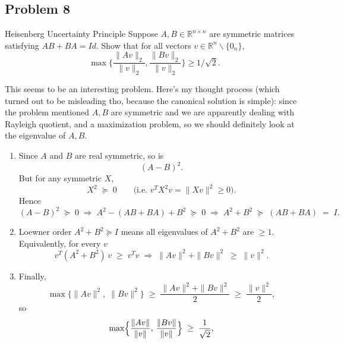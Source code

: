 \documentclass[../main]{subfiles}
\begin{document}
\subsection{Problem 8}
\begin{bbox}{Heisenberg Uncertainty Principle}
    Suppose $A, B \in \mathbb R^{n\times n}$ are symmetric matrices satisfying $AB + BA = Id$. Show that for all vectors $v\in \mathbb R^n\backslash\{0_n\}$,
    \[
    \max \{\frac{\|Av\|_2}{\|v\|_2}, \frac{\|Bv\|_2}{\|v\|_2}\} \geq 1/\sqrt{2}.
    \]
\end{bbox}
\begin{solution}
    This seems to be an interesting problem. Here's my thought process (which turned out to be misleading tho, because the canonical solution is simple): since the problem mentioned $A,B$ are symmetric and we are apparently dealing with Rayleigh quotient, and a maximization problem, so we should definitely look at the eigenvalue of $A,B$.
    \begin{enumerate}
        \item Since \(A\) and \(B\) are real symmetric, so is
            \[
            (A - B)^2.
            \]
            But for any symmetric \(X\),  
            \[
            X^2\;\succeq\;0
            \qquad\bigl(\text{i.e.\ }v^T X^2 v = \|Xv\|^2\ge0\bigr).
            \]
            Hence
            \[
            (A-B)^2 \;\succeq\;0
            \;\Longrightarrow\;
            A^2 - (AB+BA) + B^2 \;\succeq\;0
            \;\Longrightarrow\;
            A^2 + B^2 \;\succeq\;(AB+BA)\;=\;I.
            \]
            \item Loewner order \(A^2+B^2\succeq I\) means all eigenvalues of \(A^2+B^2\) are \(\ge 1\).  Equivalently, for every \(v\)
            \[
            v^T(A^2+B^2)\,v
            \;\ge\;v^T v
            \;\Longrightarrow\;
            \|Av\|^2 + \|Bv\|^2 \;\ge\;\|v\|^2.
            \]
            \item Finally,
                \[
                \max\{\|Av\|^2,\;\|Bv\|^2\}
                \;\ge\;\frac{\|Av\|^2 + \|Bv\|^2}{2}
                \;\ge\;\frac{\|v\|^2}{2},
                \]
                so
                \[
                \max\Bigl\{\frac{\|Av\|}{\|v\|},\,\frac{\|Bv\|}{\|v\|}\Bigr\}
                \;\ge\;\frac1{\sqrt 2},
                \]
    \end{enumerate}


\end{solution}
\end{document}
